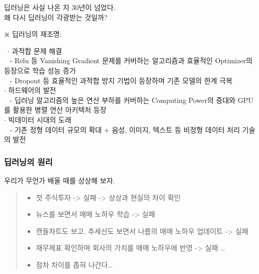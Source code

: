 \documentclass[11pt]{article}
\providecommand{\tightlist}{%
      \setlength{\itemsep}{0pt}\setlength{\parskip}{0pt}}
\begin{document}
 딥러닝은 사실 나온 지 30년이 넘었다.\\
왜 다시 딥러닝이 각광받는 것일까?

\(\divideontimes\) 딥러닝의 재조명:

~\(\cdot\) 과적합 문제 해결\\
\hspace*{0.333em} ~ - Relu 등 Vanishing Gradient 문제를 커버하는
알고리즘과 효율적인 Optimizer의 등장으로 학습 성능 증가\\
\hspace*{0.333em} ~ - Dropout 등 효율적인 과적합 방지 기법이 등장하며
기존 모델의 한계 극복\\

\(\cdot\) 하드웨어의 발전\\
\hspace*{0.333em} ~ - 딥러닝 알고리즘의 높은 연산 부하를 커버하는
Computing Power의 증대와 GPU를 활용한 병렬 연산 아키텍처 등장\\

\(\cdot\) 빅데이터 시대의 도래\\
\hspace*{0.333em} ~ - 기존 정형 데이터 규모의 확대 + 음성, 이미지,
텍스트 등 비정형 데이터 처리 기술의 발전

    \hypertarget{uxb525uxb7ecuxb2dduxc758-uxc6d0uxb9ac}{%
\subsubsection{딥러닝의
원리}\label{uxb525uxb7ecuxb2dduxc758-uxc6d0uxb9ac}}

 우리가 무언가 배울 때를 상상해 보자.

\begin{quote}
\begin{itemize}
\tightlist
\item
  첫 주식투자 -\textgreater{} 실패 -\textgreater{} 상상과 현실의 차이
  확인\\
\item
  뉴스를 보면서 매매 노하우 학습 -\textgreater{} 실패\\
\item
  캔들차트도 보고, 추세선도 보면서 나름의 매매 노하우 업데이트
  -\textgreater{} 실패\\
\item
  재무제표 확인하며 회사의 가치를 매매 노하우에 반영 -\textgreater{}
  실패 \ldots{}\\
\item
  점차 차이를 좁혀 나간다\ldots{}
\end{itemize}
\end{quote}
\end{document}
